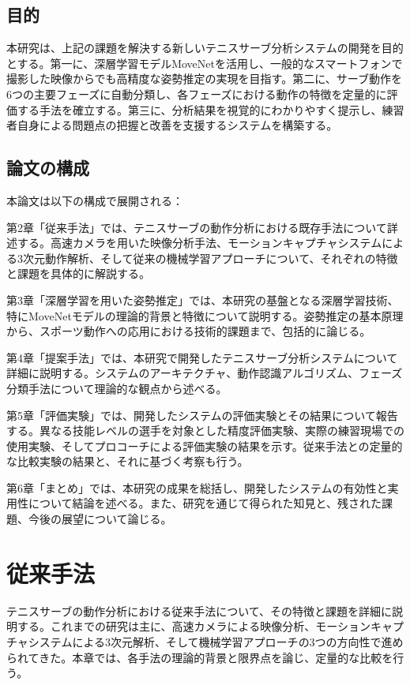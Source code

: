 \documentclass[oneside]{suribt}[11pt]
\begin{document}
\section{目的}
本研究は、上記の課題を解決する新しいテニスサーブ分析システムの開発を目的とする。第一に、深層学習モデルMoveNetを活用し、一般的なスマートフォンで撮影した映像からでも高精度な姿勢推定の実現を目指す。第二に、サーブ動作を6つの主要フェーズに自動分類し、各フェーズにおける動作の特徴を定量的に評価する手法を確立する。第三に、分析結果を視覚的にわかりやすく提示し、練習者自身による問題点の把握と改善を支援するシステムを構築する。

\section{論文の構成}
本論文は以下の構成で展開される：

第2章「従来手法」では、テニスサーブの動作分析における既存手法について詳述する。高速カメラを用いた映像分析手法、モーションキャプチャシステムによる3次元動作解析、そして従来の機械学習アプローチについて、それぞれの特徴と課題を具体的に解説する。

第3章「深層学習を用いた姿勢推定」では、本研究の基盤となる深層学習技術、特にMoveNetモデルの理論的背景と特徴について説明する。姿勢推定の基本原理から、スポーツ動作への応用における技術的課題まで、包括的に論じる。

第4章「提案手法」では、本研究で開発したテニスサーブ分析システムについて詳細に説明する。システムのアーキテクチャ、動作認識アルゴリズム、フェーズ分類手法について理論的な観点から述べる。

第5章「評価実験」では、開発したシステムの評価実験とその結果について報告する。異なる技能レベルの選手を対象とした精度評価実験、実際の練習現場での使用実験、そしてプロコーチによる評価実験の結果を示す。従来手法との定量的な比較実験の結果と、それに基づく考察も行う。

第6章「まとめ」では、本研究の成果を総括し、開発したシステムの有効性と実用性について結論を述べる。また、研究を通じて得られた知見と、残された課題、今後の展望について論じる。

\chapter{従来手法}

テニスサーブの動作分析における従来手法について、その特徴と課題を詳細に説明する。これまでの研究は主に、高速カメラによる映像分析\cite{abrams2018}、モーションキャプチャシステムによる3次元解析\cite{reid2007}、そして機械学習アプローチ\cite{openpose}の3つの方向性で進められてきた。本章では、各手法の理論的背景と限界点を論じ、定量的な比較を行う。
\end{document}
